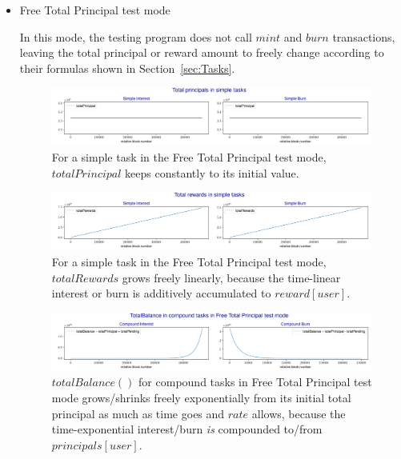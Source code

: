 \documentclass{article}
\begin{document}
\begin{itemize}
  \item {Free Total Principal test mode}  \newline

  In this mode, the testing program does not call $mint$ and $burn$ transactions, 
  leaving the total principal or reward amount to freely change according 
  to their formulas shown in Section~\ref{sec:Tasks}.

  \begin{figure}[H]
    \centering
    \includegraphics[width=5.3in]{images/_6.3_sim_total_principal.jpg}
    \caption{For a simple task in the Free Total Principal test mode, 
    $totalPrincipal$ keeps constantly to its initial value.
    }
    \label{fig:fixed_sim_pillars_mode_free}
  \end{figure}

  \begin{figure}[H]
    \centering
    \includegraphics[width=5.3in]{images/_6.3_sim_total_rewards.jpg}
    \caption{For a simple task in the Free Total Principal test mode, 
    $totalRewards$ grows freely linearly, 
    because the time-linear interest or burn is additively 
    accumulated to $reward[user]$.
    }
    \label{fig:fixed_sim_pillars_mode_free}
  \end{figure}

  \begin{figure}[H]
    \centering
    \includegraphics[width=5.3in]{images/_6.3_free_com_total_balance.jpg}
    \caption{$totalBalance()$ for compound tasks in 
    Free Total Principal test mode grows/shrinks freely exponentially 
    from its initial total principal 
    as much as time goes and $rate$ allows,
    because the 
    time-exponential interest/burn \textit{is} compounded to/from $principals[user]$.
    }
    \label{fig:free_com_total_mode}
  \end{figure}
  

\end{itemize}
\end{document}
